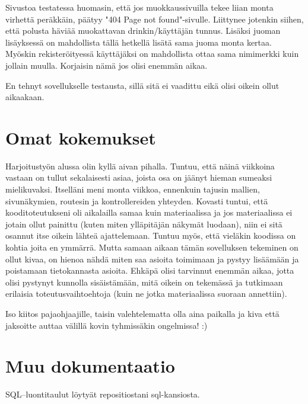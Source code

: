 \documentclass[a4paper]{article}
\begin{document}
Sivustoa testatessa huomasin, että jos muokkaussivuilla tekee liian monta virhettä peräkkäin, päätyy "404 Page not found"-sivulle. Liittynee jotenkin siihen, että polusta häviää muokattavan drinkin/käyttäjän tunnus. Lisäksi juoman lisäyksessä on mahdollista tällä hetkellä lisätä sama juoma monta kertaa.  Myöskin rekisteröityessä käyttäjäksi on mahdollista ottaa sama nimimerkki kuin jollain muulla. Korjaisin nämä jos olisi enemmän aikaa. 

En tehnyt sovellukselle testausta, sillä sitä ei vaadittu eikä olisi oikein ollut aikaakaan.

\section{Omat kokemukset}
Harjoitustyön alussa olin kyllä aivan pihalla. Tuntuu, että näinä viikkoina vastaan on tullut sekalaisesti asiaa, joista osa on jäänyt hieman sumeaksi mielikuvaksi. Itselläni meni monta viikkoa, ennenkuin tajusin mallien, sivunäkymien, routesin ja kontrollereiden yhteyden. Kovasti tuntui, että kooditoteutukseni oli aikalailla samaa kuin materiaalissa ja jos materiaalissa ei jotain ollut painittu (kuten miten ylläpitäjän näkymät luodaan), niin ei sitä osannut itse oikein lähteä ajattelemaan. Tuntuu myös, että vieläkin koodissa on kohtia joita en ymmärrä. Mutta samaan aikaan tämän sovelluksen tekeminen on ollut kivaa, on hienoa nähdä miten saa asioita toimimaan ja pystyy lisäämään ja poistamaan tietokannasta asioita. Ehkäpä olisi tarvinnut enemmän aikaa, jotta olisi pystynyt kunnolla sisäistämään, mitä oikein on tekemässä ja tutkimaan erilaisia toteutusvaihtoehtoja (kuin ne jotka materiaalissa suoraan annettiin). 

Iso kiitos pajaohjaajille, taisin valehtelematta olla aina paikalla ja kiva että jaksoitte auttaa välillä kovin tyhmissäkin ongelmissa! :)

\section{Muu dokumentaatio}

SQL--luontitaulut löytyät repositiostani sql-kansiosta.
\end{document}
